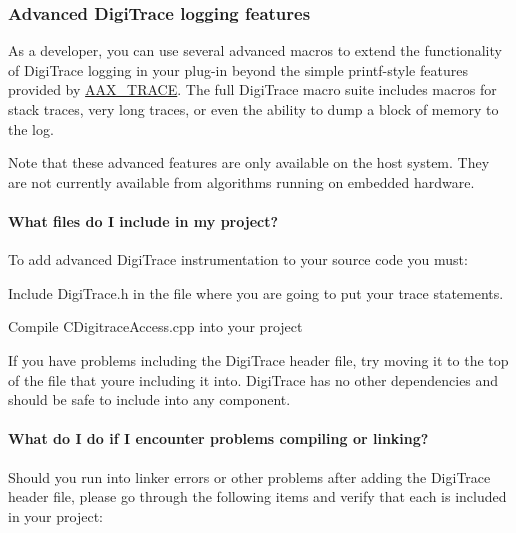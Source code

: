 \hypertarget{a00834_digitrace__tracingfromplugins__advancedlogging}{}\subsubsection{Advanced Digi\+Trace logging features}\label{a00834_digitrace__tracingfromplugins__advancedlogging}
 As a developer, you can use several advanced macros to extend the functionality of Digi\+Trace logging in your plug-\/in beyond the simple {\ttfamily printf}-\/style features provided by \mbox{\hyperlink{a00395_ab53f1d6a94f8b6ebb3a101f71bfe4e82}{A\+A\+X\+\_\+\+T\+R\+A\+CE}}. The full Digi\+Trace macro suite includes macros for stack traces, very long traces, or even the ability to dump a block of memory to the log.

 Note that these advanced features are only available on the host system. They are not currently available from algorithms running on embedded hardware.

\hypertarget{a00834_digitrace__advancedlogging__filestoinclude}{}\paragraph{What files do I include in my project?}\label{a00834_digitrace__advancedlogging__filestoinclude}
 To add advanced Digi\+Trace instrumentation to your source code you must\+:


\begin{DoxyEnumerate}
\item Include Digi\+Trace.\+h in the file where you are going to put your trace statements.
\item Compile C\+Digitrace\+Access.\+cpp into your project
\end{DoxyEnumerate}

 If you have problems including the Digi\+Trace header file, try moving it to the top of the file that you\textquotesingle{}re including it into. Digi\+Trace has no other dependencies and should be safe to include into any component.

\hypertarget{a00834_digitrace__advancedlogging__filestoinclude__troubleshooting}{}\paragraph{What do I do if I encounter problems compiling or linking?}\label{a00834_digitrace__advancedlogging__filestoinclude__troubleshooting}
 Should you run into linker errors or other problems after adding the Digi\+Trace header file, please go through the following items and verify that each is included in your project\+:


